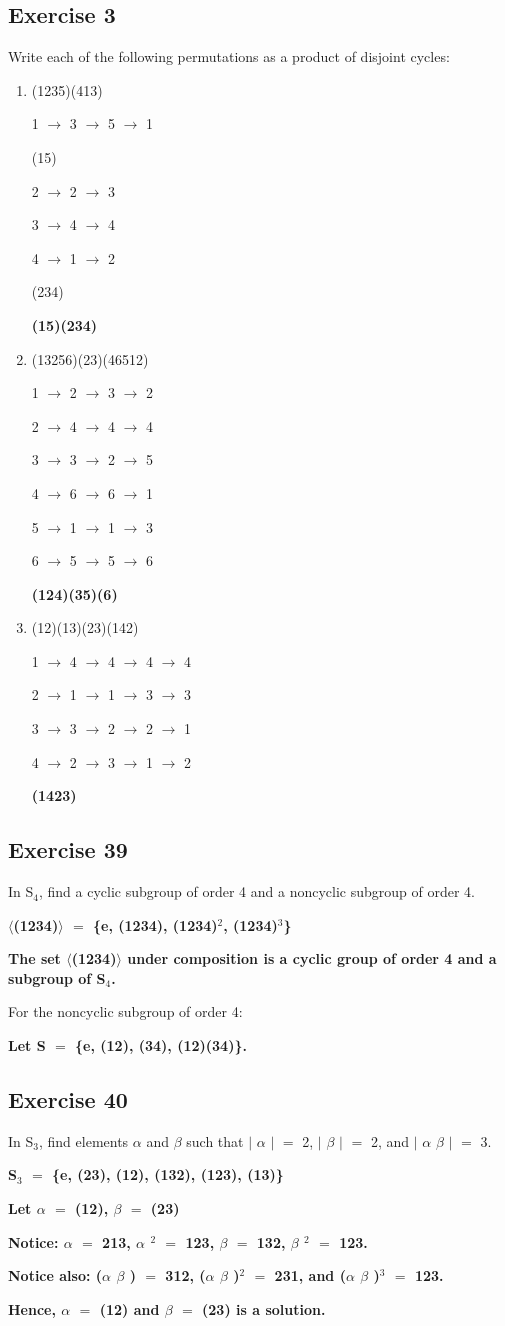 \documentclass{article}
\newcommand{\mt}[1]{\ensuremath{#1}}
\newcommand\ssc[2][\DefaultOpt]{%
  \def\DefaultOpt{#2}%
  \subsection[#1]{#2}%
}
\newcommand{\balist}{\begin{enumerate}[label=\alph*.]}
\newcommand{\elist}{\end{enumerate}}
\newcommand{\afa}{\mt{\alpha} }
\newcommand{\bta}{\mt{\beta} }
\newcommand{\lra}{ \mt{\longrightarrow} } %
\newcommand{\av}[1]{\mt{|}#1\mt{|}}  %
\newcommand{\bk}[1]{\{#1\}}
\newcommand{\abk}[1]{\mt{\langle}#1\mt{\rangle}}
\newcommand{\eql}{\mt{=} }
\newcommand{\uw}[2]{#1\mt{_{#2}}}
\newcommand{\uf}[2]{#1\mt{^{#2}}}
\begin{document}
\ssc{Exercise 3}{

Write each of the following permutations as a product of disjoint cycles:

\balist
\item (1235)(413)

1 \lra 3 \lra 5 \lra 1

(15)

2 \lra 2 \lra 3

3 \lra 4 \lra 4

4 \lra 1 \lra 2

(234)

\textbf{(15)(234)}

\item (13256)(23)(46512)

1 \lra 2 \lra 3 \lra 2

2 \lra 4 \lra 4 \lra 4

3 \lra 3 \lra 2 \lra 5

4 \lra 6 \lra 6 \lra 1

5 \lra 1 \lra 1 \lra 3

6 \lra 5 \lra 5 \lra 6

\textbf{(124)(35)(6)}

\item (12)(13)(23)(142)

1 \lra 4 \lra 4 \lra 4 \lra 4

2 \lra 1 \lra 1 \lra 3 \lra 3

3 \lra 3 \lra 2 \lra 2 \lra 1

4 \lra 2 \lra 3 \lra 1 \lra 2

\textbf{(1423)}
\elist

}

\ssc{Exercise 39}{

In \uw{S}{4}, find a cyclic subgroup of order 4 and a noncyclic subgroup of order 4.

\textbf{\abk{(1234)} \eql \bk{e, (1234), \uf{(1234)}{2}, \uf{(1234)}{3}}}

\textbf{The set \abk{(1234)} under composition is a cyclic group of order 4 and a subgroup of \uw{S}{4}.}

For the noncyclic subgroup of order 4:

\textbf{Let S \eql \bk{e, (12), (34), (12)(34)}.}

}

\ssc{Exercise 40}{

In \uw{S}{3}, find elements \afa and \bta such that \av{ \afa} \eql 2, \av{ \bta} \eql 2, and \av{ \afa\bta} \eql 3.

\textbf{\uw{S}{3} \eql \bk{e, (23), (12), (132), (123), (13)}
}

\textbf{Let \afa \eql (12), \bta \eql (23)
}

\textbf{Notice: \afa \eql 213, \uf{\afa}{2} \eql 123, \bta \eql 132, \uf{\bta}{2} \eql 123.
}

\textbf{Notice also: (\afa\bta) \eql 312, \uf{(\afa\bta)}{2} \eql 231, and \uf{(\afa\bta)}{3} \eql 123.
}

\textbf{Hence, \afa \eql (12) and \bta \eql (23) is a solution.
}}
\end{document}
